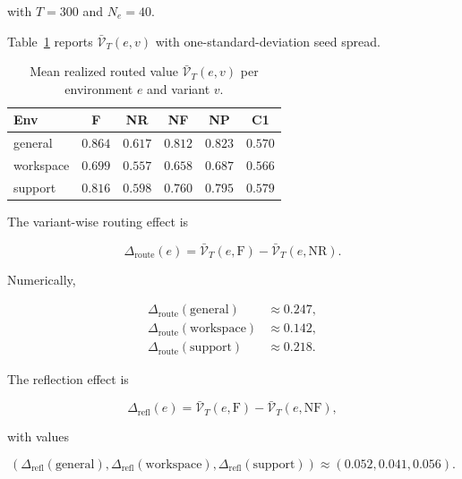 \documentclass{article} %
\begin{document}
with $T=300$ and $N_e=40$.

Table~\ref{tab:app-mean-reward-sweeps} reports $\bar{\mathcal{V}}_T(e,v)$ with one-standard-deviation seed spread.

\begin{table}[h]
\centering
\small
\begin{tabular}{lccccc}
\toprule
Env & F & NR & NF & NP & C1 \\
\midrule
general    & $0.864$ & $0.617$ & $0.812$ & $0.823$ & $0.570$ \\
workspace  & $0.699$ & $0.557$ & $0.658$ & $0.687$ & $0.566$ \\
support    & $0.816$ & $0.598$ & $0.760$ & $0.795$ & $0.579$ \\
\bottomrule
\end{tabular}
\caption{Mean realized routed value $\bar{\mathcal{V}}_T(e,v)$ per environment $e$ and variant $v$.}
\label{tab:app-mean-reward-sweeps}
\end{table}

The variant-wise routing effect is

\begin{equation}
\label{eq:app-routing-effect}
\Delta_{\mathrm{route}}(e) = \bar{\mathcal{V}}_T(e,\mathrm{F}) - \bar{\mathcal{V}}_T(e,\mathrm{NR}).
\end{equation}

Numerically,

\begin{align}
\label{eq:app-routing-numbers}
\Delta_{\mathrm{route}}(\mathrm{general}) &\approx 0.247,\\
\Delta_{\mathrm{route}}(\mathrm{workspace}) &\approx 0.142,\\
\Delta_{\mathrm{route}}(\mathrm{support}) &\approx 0.218.
\end{align}

The reflection effect is

\begin{equation}
\label{eq:app-reflection-effect}
\Delta_{\mathrm{refl}}(e) = \bar{\mathcal{V}}_T(e,\mathrm{F}) - \bar{\mathcal{V}}_T(e,\mathrm{NF}),
\end{equation}

with values

\begin{equation}
\label{eq:app-reflection-numbers}
(\Delta_{\mathrm{refl}}(\mathrm{general}),\Delta_{\mathrm{refl}}(\mathrm{workspace}),\Delta_{\mathrm{refl}}(\mathrm{support}))
\approx (0.052, 0.041, 0.056).
\end{equation}
\end{document}
